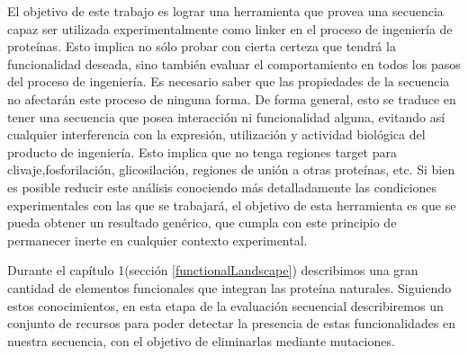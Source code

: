 El objetivo de este trabajo es lograr una herramienta que provea una secuencia capaz ser utilizada experimentalmente como linker en el proceso de ingeniería de proteínas. 
Esto implica no sólo probar con cierta certeza que tendrá la funcionalidad deseada, sino también evaluar el comportamiento en todos los pasos del proceso de ingeniería. 
Es necesario saber que las propiedades de la secuencia no afectarán este proceso de ninguna forma.
De forma general, esto se traduce en tener una secuencia que posea interacción ni funcionalidad alguna, evitando así cualquier interferencia con la expresión, utilización y actividad biológica del producto de ingeniería.
Esto implica que no tenga regiones target para clivaje,fosforilación, glicosilación, regiones de unión a otras proteínas, etc.
Si bien es posible reducir este análisis conociendo más detalladamente las condiciones experimentales con las que se trabajará, el objetivo de esta herramienta es que se pueda obtener 
un resultado genérico, que cumpla con este principio de permanecer inerte en cualquier contexto experimental. 

Durante el capítulo 1(sección \ref{functionalLandscape}) describimos una gran cantidad de elementos funcionales que integran las proteína naturales. 
Siguiendo estos conocimientos, en esta etapa de la evaluación secuencial describiremos un conjunto de recursos para poder detectar la presencia de estas funcionalidades en nuestra secuencia, 
con el objetivo de eliminarlas mediante mutaciones.






